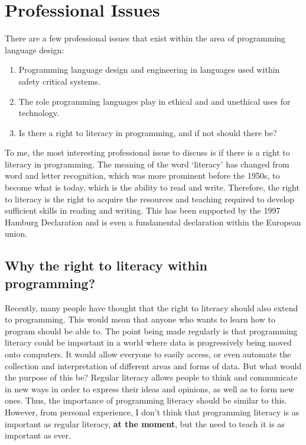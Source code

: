 \chapter{Professional Issues}
\label{chap:professional-issues}

There are a few professional issues that exist within the area of programming language design:

\begin{enumerate}
    \item Programming language design and engineering in languages used within safety critical systems.
    \item The role programming languages play in ethical and and unethical uses for technology.
    \item Is there a right to literacy in programming, and if not should there be?
\end{enumerate}

To me, the most interesting professional issue to discuss is if there is a right to literacy in programming. The meaning of the word `literacy' has changed from word and letter recognition, which was more prominent before the 1950s, to become what is today, which is the ability to read and write\textsuperscript{\cite{gee_1991}}. Therefore, the right to literacy is the right to acquire the resources and teaching required to develop sufficient skills in reading and writing. This has been supported by the 1997 Hamburg Declaration\textsuperscript{\cite{hamburg_1997}} and is even a fundamental declaration within the European union\textsuperscript{\cite{edrl_2016}}.

\section{Why the right to literacy within programming?}

Recently, many people have thought that the right to literacy should also extend to programming. This would mean that anyone who wants to learn how to program should be able to. The point being made regularly is that programming literacy could be important in a world where data is progressively being moved onto computers. It would allow everyone to easily access, or even automate the collection and interpretation of different areas and forms of data. But what would the purpose of this be? Regular literacy allows people to think and communicate in new ways in order to express their ideas and opinions, as well as to form new ones. Thus, the importance of programming literacy should be similar to this. However, from personal experience, I don't think that programming literacy is as important as regular literacy, \textbf{at the moment}, but the need to teach it is as important as ever.

